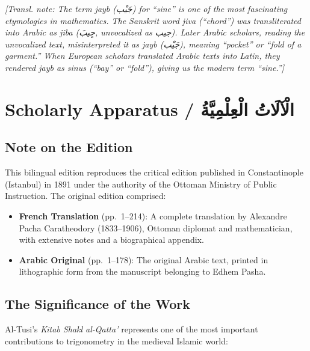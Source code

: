 \documentclass[11pt,a4paper]{article}
\theoremstyle{plain}
\theoremstyle{definition}
\theoremstyle{remark}
\newcommand{\ar}[1]{{\arabicfont\beginR #1\endR}}
\newcommand{\transnote}[1]{%
  \par\vspace{0.3em}%
  \noindent\textcolor{notecolor}{\textit{[Transl. note: #1]}}%
  \vspace{0.3em}%
}
\begin{document}
\transnote{The term \textit{jayb} (\ar{جَيْب}) for ``sine'' is one of the
most fascinating etymologies in mathematics. The Sanskrit word \textit{jiva}
(``chord'') was transliterated into Arabic as \textit{jiba} (\ar{جِيبَ},
unvocalized as \ar{جيب}). Later Arabic scholars, reading the unvocalized text,
misinterpreted it as \textit{jayb} (\ar{جَيْب}), meaning ``pocket'' or
``fold of a garment.'' When European scholars translated Arabic texts into
Latin, they rendered \textit{jayb} as \textit{sinus} (``bay'' or ``fold''),
giving us the modern term ``sine.''}

\clearpage

\section*{Scholarly Apparatus / \ar{الْآلَاتُ الْعِلْمِيَّةُ}}

\subsection*{Note on the Edition}

This bilingual edition reproduces the critical edition published in
Constantinople (Istanbul) in 1891 under the authority of the Ottoman Ministry
of Public Instruction. The original edition comprised:

\begin{itemize}[leftmargin=2em]
\item \textbf{French Translation} (pp.~1--214): A complete translation by
Alexandre Pacha Caratheodory (1833--1906), Ottoman diplomat and mathematician,
with extensive notes and a biographical appendix.
\item \textbf{Arabic Original} (pp.~1--178): The original Arabic text, printed
in lithographic form from the manuscript belonging to Edhem Pasha.
\end{itemize}

\subsection*{The Significance of the Work}

Al-Tusi's \textit{Kitab Shakl al-Qatta'} represents one of the most important
contributions to trigonometry in the medieval Islamic world:
\end{document}
